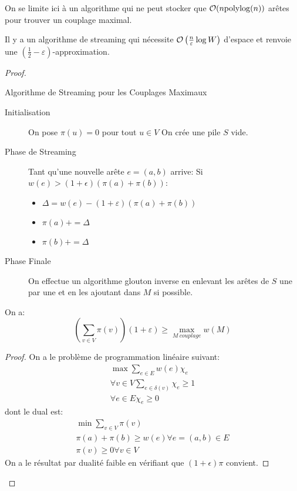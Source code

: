 \documentclass[math, info]{cours}
\begin{document}
On se limite ici à un algorithme qui ne peut stocker que $\mathcal{O}(n\mathrm{polylog}(n))$ arêtes pour trouver un couplage maximal.

\begin{thm}
	Il y a un algorithme de streaming qui nécessite $\mathcal{O}\left(\frac{n}{\varepsilon}\log W \right)$ d'espace et renvoie une $\left(\frac{1}{2}-\varepsilon \right)$-approximation.
\end{thm}
\begin{proof}
\begin{algorithm}
	\caption{Algorithme de Streaming pour les Couplages Maximaux}
	\begin{description}
		\item[Initialisation] On pose $\pi(u) = 0$ pour tout $u \in V$
			On crée une pile $S$ vide.
		\item[Phase de Streaming]
			Tant qu'une nouvelle arête $e =(a, b)$ arrive:
			Si $w(e) > (1 + \epsilon)(\pi(a) + \pi(b))$:
			\begin{itemize}
				\item $\Delta = w(e) - (1 + \varepsilon)(\pi(a) + \pi(b))$
				\item $\pi(a) += \Delta$
				\item $\pi(b) += \Delta$
			\end{itemize}
		\item[Phase Finale] On effectue un algorithme glouton inverse en enlevant les arêtes de $S$ une par une et en les ajoutant dans $M$ si possible.
	\end{description}
	\label{alg:streamingmatching}
\end{algorithm}

\begin{lemme}
	On a:
	\begin{equation*}
		\left(\sum_{v \in V} \pi(v) \right)\left(1 + \varepsilon \right) \geq \max_{M \ couplage} w(M)
	\end{equation*}
	\label{lemma:streammatching1}
\end{lemme}
\begin{proof}
	On a le problème de programmation linéaire suivant:
	\begin{align*}
		\max \sum_{e \in E} w(e)\chi_{e}\\
		\forall v \in V \sum_{e \in \delta(v)} \chi_{e} \geq 1\\
		\forall e \in E \chi_{e} \geq 0
	\end{align*}
	dont le dual est:
	\begin{align*}
		\min \sum_{v \in V}\pi(v)\\
		\pi(a) + \pi(b) \geq w(e) \forall e=(a, b) \in E\\
		\pi(v) \geq 0 \forall v \in V
	\end{align*}
	On a le résultat par dualité faible en vérifiant que $(1 + \epsilon)\pi$ convient.
\end{proof}


\end{proof}
\end{document}
